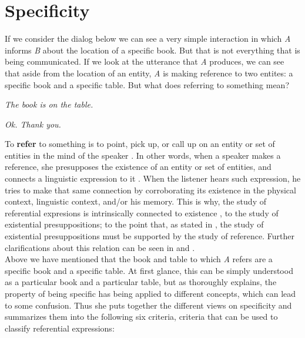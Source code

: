 \section{Specificity}
\label{sect:spec}

If we consider the dialog below we can see a very simple interaction in which \textit{A} informs \textit{B} about the location of a specific book. But that is not everything that is being communicated. If we look at the utterance that \textit{A} produces, we can see that aside from the location of an entity, \textit{A} is making reference to two entites: a specific book and a specific table. But what does referring to something mean?\\  

\begin{exe}
  \ex\label{ex:dialog}
  \begin{xlistA}
    \item \textit{The book is on the table.}
    \item \textit{Ok. Thank you.}
  \end{xlistA}
\end{exe}

To \textbf{refer} to something is to point, pick up, or call up on an entity or set of entities \citep{lyons1995linguistic} in the mind of the speaker \citep{caudet1999expresiones}. In other words, when a speaker makes a reference, she presupposes the existence of an entity or set of entities, and connects a linguistic expression to it \citep{garcia1998presuposiciones}. When the listener hears such expression, he tries to make that same connection by corroborating its existence in the physical context, linguistic context, and/or his memory. This is why, the study of referential expresions is intrinsically connected to existence \citep{lyons1995linguistic}, to the study of existential presuppositions; to the point that, as stated in \citet{garcia1998presuposiciones}, the study of existential presuppositions must be supported by the study of reference. Further clarifications about this relation can be seen in \citet{lyons1995linguistic,garcia1998presuposiciones} and \citet{herrasti2011caracteristicas}.\\

Above we have mentioned that the book and table to which \textit{A} refers are a specific book and a specific table. At first glance, this can be simply understood as a particular book and a particular table, but as \citet{caudet1999expresiones} thoroughly explains, the property of being specific has being applied to different concepts, which can lead to some confusion. Thus she puts together the different views on specificity and summarizes them into the following six criteria, criteria that can be used to classify referential expressions:\\

